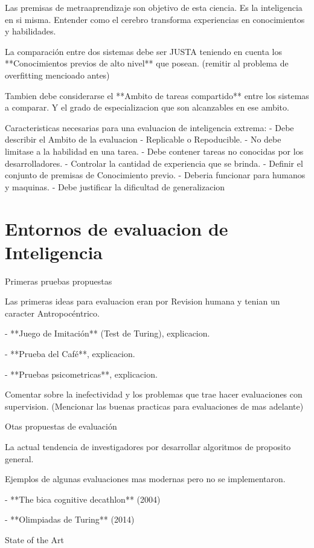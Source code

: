 Las premisas de metraaprendizaje son objetivo de esta ciencia. Es la inteligencia en si misma. Entender como el cerebro transforma experiencias en conocimientos y habilidades.

La comparación entre dos sistemas debe ser JUSTA teniendo en cuenta los **Conocimientos previos de alto nivel** que posean. (remitir al problema de overfitting mencioado antes)

Tambien debe considerarse el **Ambito de tareas compartido** entre los sistemas a comparar. Y el grado de especializacion que son alcanzables en ese ambito.

Caracteristicas necesarias para una evaluacion de inteligencia extrema:
- Debe describir el Ambito de la evaluacion
- Replicable o Repoducible.
- No debe limitase a la habilidad en una tarea.
- Debe contener tareas no conocidas por los desarrolladores.
- Controlar la cantidad de experiencia que se brinda.
- Definir el conjunto de premisas de Conocimiento previo.
- Deberia funcionar para humanos y maquinas.
- Debe justificar la dificultad de generalizacion

\section{Entornos de evaluacion de Inteligencia}\label{section:state-of-the-art:inteligence-evaluation-enviroments}

Primeras pruebas propuestas

Las primeras ideas para evaluacion eran por Revision humana y tenian un caracter Antropocéntrico.

- **Juego de Imitación** (Test de Turing), explicacion.

- **Prueba del Café**, explicacion.

- **Pruebas psicometricas**, explicacion.

Comentar sobre la inefectividad y los problemas que trae hacer evaluaciones con supervision. (Mencionar las buenas practicas para evaluaciones de mas adelante)

Otas propuestas de evaluación

La actual tendencia de investigadores por desarrollar algoritmos de proposito general.  

Ejemplos de algunas evaluaciones mas modernas pero no se implementaron.

- **The bica cognitive decathlon** (2004)

- **Olimpiadas de Turing** (2014)

State of the Art

